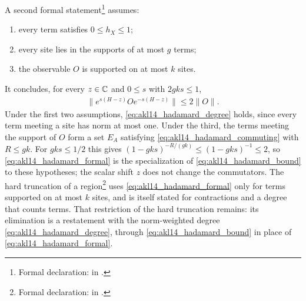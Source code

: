 \documentclass{article}
\begin{document}
A second formal statement\footnote{Formal declaration:
     in
    .}
assumes:
\begin{enumerate}
    \item every term satisfies $0\le h_X\le1$;
    \item every site lies in the supports of at most $g$ terms;
    \item the observable $O$ is supported on at most $k$ sites.
\end{enumerate}
It concludes, for every $z\in\mathbb{C}$ and $0\le s$ with $2gks\le1$,
\begin{align}
    \lVert e^{s(H-z)}Oe^{-s(H-z)}\rVert\le2\lVert O\rVert.
    \label{eq:akl14_hadamard_formal}
\end{align}
Under the first two assumptions, \eqref{eq:akl14_hadamard_degree} holds,
since every term meeting a site has norm at most one. Under the third,
the terms meeting the support of $O$ form a set $E_A$ satisfying
\eqref{eq:akl14_hadamard_commuting} with $R\le gk$. For $gks\le1/2$ this gives
$(1-gks)^{-R/(gk)}\le(1-gks)^{-1}\le2$, so
\eqref{eq:akl14_hadamard_formal} is the specialization of
\eqref{eq:akl14_hadamard_bound} to these hypotheses; the scalar shift $z$
does not change the commutators. The hard truncation of a
region\footnote{Formal declaration:
    in .}
uses \eqref{eq:akl14_hadamard_formal} only for terms supported on at most
$k$ sites, and is itself stated for contractions and a degree that counts
terms. That restriction of the hard truncation remains: its elimination is a
restatement with the norm-weighted degree \eqref{eq:akl14_hadamard_degree},
through \eqref{eq:akl14_hadamard_bound} in place of
\eqref{eq:akl14_hadamard_formal}.
\end{document}
